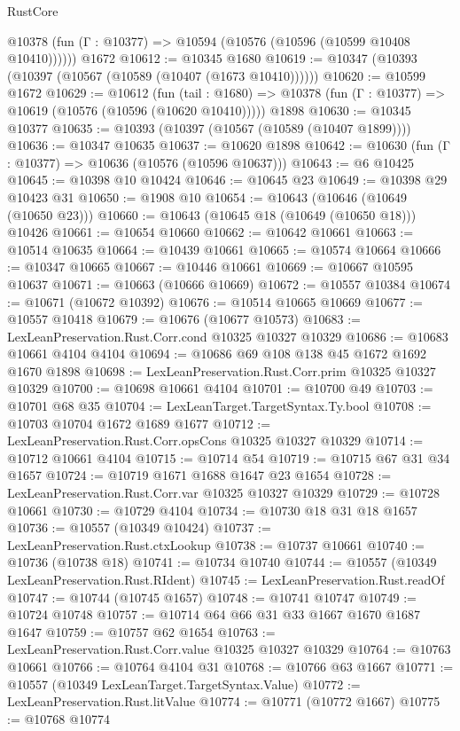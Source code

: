 \begin{lexlean}{RustCore}
\begin{coremodule}
      @10378 (fun (Γ : @10377) => @10594 (@10576 (@10596 (@10599 @10408 @10410))))))
    @1672
@10612 := @10345 @1680
@10619 := @10347 (@10393 (@10397 (@10567 (@10589 (@10407 (@1673 @10410))))))
@10620 := @10599 @1672
@10629 := @10612
    (fun (tail : @1680) => @10378 (fun (Γ : @10377) => @10619 (@10576 (@10596 (@10620 @10410)))))
    @1898
@10630 := @10345 @10377
@10635 := @10393 (@10397 (@10567 (@10589 (@10407 @1899))))
@10636 := @10347 @10635
@10637 := @10620 @1898
@10642 := @10630 (fun (Γ : @10377) => @10636 (@10576 (@10596 @10637)))
@10643 := @6 @10425
@10645 := @10398 @10 @10424
@10646 := @10645 @23
@10649 := @10398 @29 @10423 @31
@10650 := @1908 @10
@10654 := @10643 (@10646 (@10649 (@10650 @23)))
@10660 := @10643 (@10645 @18 (@10649 (@10650 @18))) @10426
@10661 := @10654 @10660
@10662 := @10642 @10661
@10663 := @10514 @10635
@10664 := @10439 @10661
@10665 := @10574 @10664
@10666 := @10347 @10665
@10667 := @10446 @10661
@10669 := @10667 @10595 @10637
@10671 := @10663 (@10666 @10669)
@10672 := @10557 @10384
@10674 := @10671 (@10672 @10392)
@10676 := @10514 @10665 @10669
@10677 := @10557 @10418
@10679 := @10676 (@10677 @10573)
@10683 := LexLeanPreservation.Rust.Corr.cond @10325 @10327 @10329
@10686 := @10683 @10661 @4104 @4104
@10694 := @10686 @69 @108 @138 @45 @1672 @1692 @1670 @1898
@10698 := LexLeanPreservation.Rust.Corr.prim @10325 @10327 @10329
@10700 := @10698 @10661 @4104
@10701 := @10700 @49
@10703 := @10701 @68 @35
@10704 := LexLeanTarget.TargetSyntax.Ty.bool
@10708 := @10703 @10704 @1672 @1689 @1677
@10712 := LexLeanPreservation.Rust.Corr.opsCons @10325 @10327 @10329
@10714 := @10712 @10661 @4104
@10715 := @10714 @54
@10719 := @10715 @67 @31 @34 @1657
@10724 := @10719 @1671 @1688 @1647 @23 @1654
@10728 := LexLeanPreservation.Rust.Corr.var @10325 @10327 @10329
@10729 := @10728 @10661
@10730 := @10729 @4104
@10734 := @10730 @18 @31 @18 @1657
@10736 := @10557 (@10349 @10424)
@10737 := LexLeanPreservation.Rust.ctxLookup
@10738 := @10737 @10661
@10740 := @10736 (@10738 @18)
@10741 := @10734 @10740
@10744 := @10557 (@10349 LexLeanPreservation.Rust.RIdent)
@10745 := LexLeanPreservation.Rust.readOf
@10747 := @10744 (@10745 @1657)
@10748 := @10741 @10747
@10749 := @10724 @10748
@10757 := @10714 @64 @66 @31 @33 @1667 @1670 @1687 @1647
@10759 := @10757 @62 @1654
@10763 := LexLeanPreservation.Rust.Corr.value @10325 @10327 @10329
@10764 := @10763 @10661
@10766 := @10764 @4104 @31
@10768 := @10766 @63 @1667
@10771 := @10557 (@10349 LexLeanTarget.TargetSyntax.Value)
@10772 := LexLeanPreservation.Rust.litValue
@10774 := @10771 (@10772 @1667)
@10775 := @10768 @10774

\end{coremodule}
\end{lexlean}
